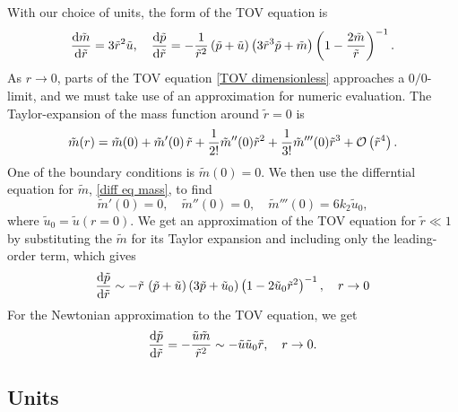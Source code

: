 With our choice of units, the form of the TOV equation is
%
\begin{align}
    \odv{\tilde m}{\tilde r} 
    = 3 \tilde r^2 \tilde u, \quad
    \odv{\tilde p}{\tilde r} 
     = - \frac{1}{\tilde r^2} \left(\tilde p + \tilde u\right) 
    \left(3  \tilde r^3 \tilde p + \tilde m\right) 
    \left(1 - \frac{2 \tilde m}{\tilde r}\right)^{-1}.
\end{align}
%
As $r \rightarrow 0$, parts of the TOV equation \autoref{TOV dimensionless} approaches a $0/0$-limit, and we must take use of an approximation for numeric evaluation.
The Taylor-expansion of the mass function around $\tilde r = 0$ is
%
\begin{equation}
    \tilde m(r) = \tilde m(0) + \tilde m'(0) \, \tilde r + \frac{1}{2!} \tilde m''(0) \tilde r^2
    + \frac{1}{3!} \tilde m'''(0) \tilde r^3 + \mathcal O\left(\tilde r^4\right).
\end{equation}
%
One of the boundary conditions is $\tilde m(0) = 0$.
We then use the differntial equation for $\tilde m$, \autoref{diff eq mass}, to find
%
\begin{equation}
    \tilde m'(0) = 0, \quad
    \tilde m''(0) = 0, \quad
    \tilde m'''(0) = 6 k_2 \tilde u_0,
\end{equation}
%
where $\tilde u_0 = \tilde u(r = 0)$.
We get an approximation of the TOV equation for $\tilde r \ll 1$ by substituting the $\tilde m$ for its Taylor expansion and including only the leading-order term, which gives
%
\begin{equation}
    \odv{\tilde p}{\tilde r}
    \sim - \tilde r \, \left(\tilde p + \tilde u\right)
    \left( 3 \tilde p + \tilde u_0  \right)
    \left(1 - 2 \tilde u_0 \tilde r^2\right)^{-1}, \quad r\rightarrow 0
\end{equation}
%
For the Newtonian approximation to the TOV equation, we get
%
\begin{equation}
    \odv{\tilde p}{\tilde r} = -\frac{\tilde u \tilde m}{\tilde r^2}
    \sim - \tilde u \tilde u_0 \tilde r,  \quad r\rightarrow 0.
\end{equation}



\subsection{Units}

